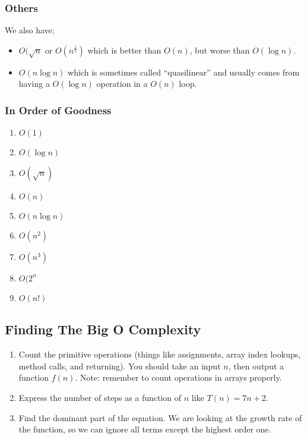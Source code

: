 \subsubsection{Others}\label{ssub:others}

We also have:
\begin{itemize}
    \item \(O(\sqrt{n}\) or \(O(n^{\frac{1}{2}})\) which is better than \(O(n)\), but worse than \(O(\log n)\).
    \item \(O(n \log n)\) which is sometimes called ``quasilinear'' and usually comes from having a \(O(\log n)\) operation in a \(O(n)\) loop.
\end{itemize}

\subsubsection{In Order of Goodness}\label{ssub:in_order_of_goodness}

\begin{enumerate}
    \item \(O(1)\)
    \item \(O(\log n)\)
    \item \(O(\sqrt{n})\)
    \item \(O(n)\)
    \item \(O(n \log n)\)
    \item \(O(n^2)\)
    \item \(O(n^3)\)
    \item \(O(2^{n}\)
    \item \(O(n!)\)
\end{enumerate}

\subsection{Finding The Big O Complexity}\label{sub:finding_the_big_o_complexity}

\begin{enumerate}
    \item Count the primitive operations (things like assignments, array index lookups, method calls, and returning). You should take an input \(n\), then output a function \(f(n)\). Note: remember to count operations in arrays properly.
    \item Express the number of steps as a function of \(n\) like \(T(n)=7n + 2\).
    \item Find the dominant part of the equation. We are looking at the growth rate of the function, so we can ignore all terms except the highest order one.
\end{enumerate}

